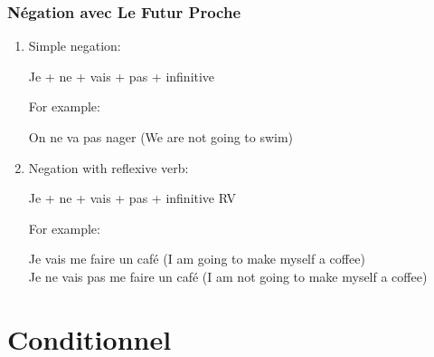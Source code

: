 \documentclass{book}
\begin{document}
\subsection{Négation avec Le Futur Proche}

\begin{enumerate}
    \item Simple negation:
        \begin{center}
            Je + ne + vais + pas + infinitive
        \end{center}
        For example:
        \begin{center}
            On ne va pas nager (We are not going to swim)
        \end{center}

    \item Negation with reflexive verb:
        \begin{center}
            Je + ne + vais + pas + infinitive RV
        \end{center}
        For example:
        \begin{center}
            Je vais me faire un café (I am going to make myself a coffee) \\
            Je ne vais pas me faire un café (I am not going to make myself a coffee)
        \end{center}
\end{enumerate}

\chapter{Conditionnel}
\end{document}
